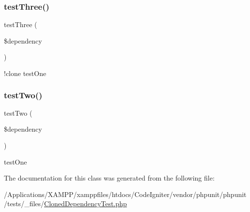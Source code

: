\mbox{\label{class_cloned_dependency_test_ae46abdb6cf6eb25f61a0f2d8f8c9e601}} 
\subsubsection{\texorpdfstring{test\+Three()}{testThree()}}
{\footnotesize\ttfamily test\+Three (\begin{DoxyParamCaption}\item[{}]{\$dependency }\end{DoxyParamCaption})}

!clone test\+One \mbox{\label{class_cloned_dependency_test_a6c27592c146d2e7e639cf0561baec72f}} 
\subsubsection{\texorpdfstring{test\+Two()}{testTwo()}}
{\footnotesize\ttfamily test\+Two (\begin{DoxyParamCaption}\item[{}]{\$dependency }\end{DoxyParamCaption})}

test\+One 

The documentation for this class was generated from the following file\+:\begin{DoxyCompactItemize}
\item 
/\+Applications/\+X\+A\+M\+P\+P/xamppfiles/htdocs/\+Code\+Igniter/vendor/phpunit/phpunit/tests/\+\_\+files/\mbox{\hyperlink{_cloned_dependency_test_8php}{Cloned\+Dependency\+Test.\+php}}\end{DoxyCompactItemize}
